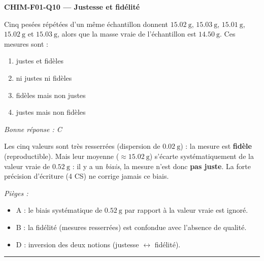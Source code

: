 \documentclass[11pt,a4paper]{article}
\begin{document}
\noindent\textbf{CHIM-F01-Q10 --- Justesse et fidélité}\par
Cinq pesées répétées d'un même échantillon donnent $\qty{15.02}{\gram}$, $\qty{15.03}{\gram}$, $\qty{15.01}{\gram}$, $\qty{15.02}{\gram}$ et $\qty{15.03}{\gram}$, alors que la masse vraie de l'échantillon est $\qty{14.50}{\gram}$. Ces mesures sont :
\begin{enumerate}[label=\Alph*)]
\item justes et fidèles
\item ni justes ni fidèles
\item fidèles mais non justes
\item justes mais non fidèles
\end{enumerate}
\textit{Bonne réponse : C}\par
Les cinq valeurs sont très resserrées (dispersion de $\qty{0.02}{\gram}$) : la mesure est \textbf{fidèle} (reproductible). Mais leur moyenne ($\approx \qty{15.02}{\gram}$) s'écarte systématiquement de la valeur vraie de $\qty{0.52}{\gram}$ : il y a un \emph{biais}, la mesure n'est donc \textbf{pas juste}. La forte précision d'écriture (4 CS) ne corrige jamais ce biais.\par
\textit{Pièges :}
\begin{itemize}
\item A : le biais systématique de $\qty{0.52}{\gram}$ par rapport à la valeur vraie est ignoré.
\item B : la fidélité (mesures resserrées) est confondue avec l'absence de qualité.
\item D : inversion des deux notions (justesse $\leftrightarrow$ fidélité).
\end{itemize}
\vspace{6pt}\hrule
\end{document}
